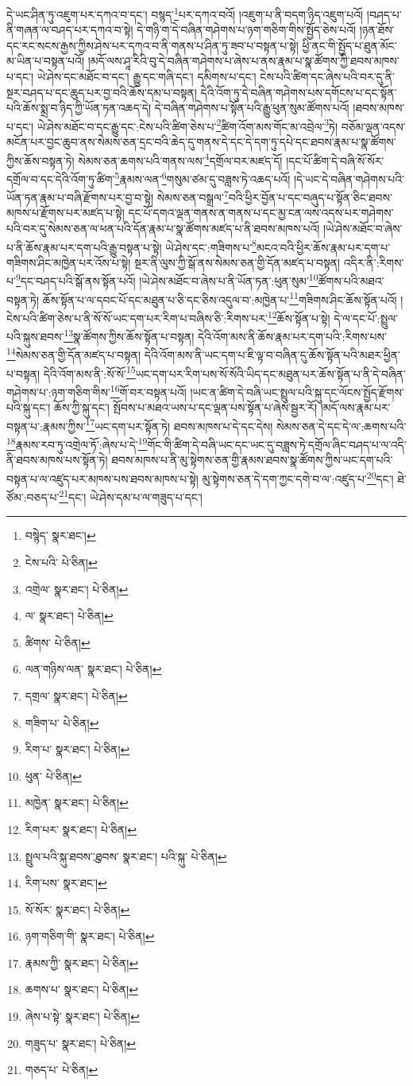 དེ་ཡང་ཤིན་ཏུ་འཇུག་པར་དཀའ་བ་དང་། བསྙད་\footnote{བསྙེད་  སྣར་ཐང་། }པར་དཀའ་བའོ། །འཇུག་པ་ནི་བདག་ཉིད་འཇུག་པའོ། །བཤད་པ་ནི་གཞན་ལ་བཤད་པར་དཀའ་བ་སྟེ། དེ་གཉི་ག་དེ་བཞིན་གཤེགས་པ་ཉག་གཅིག་གིས་སྤྱོད་ཅེས་པའོ། །ཉན་ཐོས་དང་རང་སངས་རྒྱས་ཀྱིས་ཤེས་པར་དཀའ་བ་ནི་གནས་པ་ཤིན་ཏུ་ཟབ་པ་བསྟན་པ་སྟེ། ཕྱི་ནང་གི་སྤྱོད་པ་ཐུན་མོང་མ་ཡིན་པ་བསྟན་པའོ། །མདོ་ལས་ཤཱ་རིའི་བུ་དེ་བཞིན་གཤེགས་པ་ཞེས་པ་ནས་རྣམ་པ་སྣ་ཚོགས་ཀྱི་ཐབས་མཁས་པ་དང་། ཡེ་ཤེས་དང་མཐོང་བ་དང་། རྒྱུ་དང་གཞི་དང་། དམིགས་པ་དང་། ངེས་པའི་ཚིག་དང་ཞེས་པའི་བར་དུ་ནི་སྔར་བཤད་པ་དང་ཆུད་པར་བྱ་བའི་ཆོས་དམ་པ་བསྟན། དེའི་འོག་ཏུ་དེ་བཞིན་གཤེགས་པས་དགོངས་པ་དང་སྟོན་པའི་ཆོས་སྨྲ་བ་ཉིད་ཀྱི་ཡོན་ཏན་འཆད་དེ། དེ་བཞིན་གཤེགས་པ་སྟོན་པའི་རྒྱུ་ཕུན་སུམ་ཚོགས་པའོ། །ཐབས་མཁས་པ་དང་། ཡེ་ཤེས་མཐོང་བ་དང་རྒྱུ་དང་:ངེས་པའི་ཚིག་ཅེས་པ་\footnote{ངེས་པའི་  པེ་ཅིན། }ཚིག་འོག་མས་གོང་མ་འབྲེལ་\footnote{འགྲེལ་  སྣར་ཐང་།  པེ་ཅིན། }ཏེ། བཅོམ་ལྡན་འདས་མངོན་པར་བྱང་ཆུབ་ནས་སེམས་ཅན་དྲང་བའི་ཆེད་དུ་གནས་དེ་དང་དེ་དག་ཏུ་དཔེ་དང་ཐབས་རྣམ་པ་སྣ་ཚོགས་ཀྱིས་ཆོས་བསྟན་ཏེ། སེམས་ཅན་ཆགས་པའི་གནས་ལས་\footnote{ལ་  སྣར་ཐང་།  པེ་ཅིན། }དགྲོལ་བར་མཛད་དོ། །དང་པོ་ཚིག་དེ་བཞི་སོ་སོར་དགྲོལ་བ་དང་དེའི་འོག་ཏུ་ཚིག་\footnote{ཚིགས་  པེ་ཅིན། }རྣམས་ལན་\footnote{ལན་གཉིས་ལན་  སྣར་ཐང་།  པེ་ཅིན། }གསུམ་ཙམ་དུ་བཟླས་ཏེ་འཆད་པའོ། །དེ་ཡང་དེ་བཞིན་གཤེགས་པའི་ཡོན་ཏན་རྣམ་པ་བཞི་རྫོགས་པར་བྱ་བ་སྟེ། སེམས་ཅན་བསྒྲལ་\footnote{དགྲལ་  སྣར་ཐང་།  པེ་ཅིན། }བའི་ཕྱིར་བྱོན་པ་དང་བཞུད་པ་སྟོན་ཅིང་ཐབས་མཁས་པ་རྫོགས་པར་མཛད་པ་སྟེ། དང་པོ་དགའ་ལྡན་གནས་ན་གནས་པ་དང་མྱ་ངན་ལས་འདས་པར་གཤེགས་པའི་བར་དུ་སེམས་ཅན་ལ་ཕན་པའི་དོན་རྣམ་པ་སྣ་ཚོགས་མཛད་པ་ནི་ཐབས་མཁས་པའོ། །ཡེ་ཤེས་མཐོང་བ་ཞེས་པ་ནི་ཆོས་རྣམ་པར་དག་པའི་རྒྱུ་བསྟན་པ་སྟེ། ཡེ་ཤེས་དང་:གཟིགས་པ་\footnote{གཟིག་པ་  པེ་ཅིན། }མངའ་བའི་ཕྱིར་ཆོས་རྣམ་པར་དག་པ་གཟིགས་ཤིང་མཁྱེན་པར་འོས་པ་སྟེ། སྔར་ནི་ལུས་ཀྱི་སྒོ་ནས་སེམས་ཅན་གྱི་དོན་མཛད་པ་བསྟན། འདིར་ནི་:རིགས་པ་\footnote{རིག་པ་  སྣར་ཐང་།  པེ་ཅིན། }དང་བཤད་པའི་སྒོ་ནས་སྟོན་པའོ། །ཡེ་ཤེས་མཐོང་བ་ཞེས་པ་ནི་ཡོན་ཏན་:ཕུན་སུམ་\footnote{ཕུན་  པེ་ཅིན། }ཚོགས་པའི་མཐའ་བསྟན་ཏེ། ཆོས་སྟོན་པ་ལ་དབང་པོ་དང་མཐུན་པ་ཅི་དང་ཅིས་འདུལ་བ་:མཁྱེན་པ་\footnote{མཁྱེན་  སྣར་ཐང་།  པེ་ཅིན། }གཟིགས་ཤིང་ཆོས་སྟོན་པའོ། །ངེས་པའི་ཚིག་ཅེས་པ་ནི་སོ་སོ་ཡང་དག་པར་རིག་པ་བཞིས་ཅི་:རིགས་པར་\footnote{རིག་པར་  སྣར་ཐང་།  པེ་ཅིན། }ཆོས་སྟོན་པ་སྟེ། དེ་ལ་དང་པོ་:སྤྲུལ་པའི་སྐུས་ཐབས་\footnote{སྤྲུལ་པའི་སྐུ་ཐབས་ུ་ཐབས་  སྣར་ཐང་། པའི་སྐུ་  པེ་ཅིན། }སྣ་ཚོགས་ཀྱིས་ཆོས་སྟོན་པ་བསྟན། དེའི་འོག་མས་ནི་ཆོས་རྣམ་པར་དག་པའི་:རིགས་པས་\footnote{རིག་པས་  སྣར་ཐང་། }སེམས་ཅན་གྱི་དོན་མཛད་པ་བསྟན། དེའི་འོག་མས་ནི་ཡང་དག་པ་ཇི་ལྟ་བ་བཞིན་དུ་ཆོས་སྟོན་པའི་མཐར་ཕྱིན་པ་བསྟན། དེའི་འོག་མས་ནི་:སོ་སོ་\footnote{སོ་སོར་  སྣར་ཐང་།  པེ་ཅིན། }ཡང་དག་པར་རིག་པས་སོ་སོའི་ཡིད་དང་མཐུན་པར་ཆོས་སྟོན་པ་ནི་དེ་བཞིན་གཤེགས་པ་:ཉག་གཅིག་གིས་\footnote{ཉག་གཅིག་གི་  སྣར་ཐང་།  པེ་ཅིན། }གོ་བར་བསྟན་པའོ། །ཡང་ན་ཚིག་དེ་བཞི་ཡང་སྤྲུལ་པའི་སྐུ་དང་ལོངས་སྤྱོད་རྫོགས་པའི་སྐུ་དང་། ཆོས་ཀྱི་སྐུ་དང་། སྤོབས་པ་མཐའ་ཡས་པ་དང་ལྡན་པས་སྟོན་པ་ཞེས་སྦྱར་རོ། །མདོ་ལས་རྣམ་པར་བསྟན་པ་:རྣམས་ཀྱིས་\footnote{རྣམས་ཀྱི་  སྣར་ཐང་།  པེ་ཅིན། }ཡང་དག་པར་སྟོན་ཏེ། ཐབས་མཁས་པ་དེ་དང་དེས། སེམས་ཅན་དེ་དང་དེ་ལ་:ཆགས་པའི་\footnote{ཆགས་པ་  སྣར་ཐང་།  པེ་ཅིན། }རྣམས་རབ་ཏུ་འགྲེལ་ཏོ་:ཞེས་པ་དེ་\footnote{ཞེས་པ་སྟེ་  སྣར་ཐང་།  པེ་ཅིན། }གོང་གི་ཚིག་དེ་བཞི་ཡང་དང་ཡང་དུ་བཟླས་ཏེ་དགྲོལ་ཞིང་བཤད་པ་ལ་འདི་ནི་ཐབས་མཁས་པས་སྟོན་ཏེ། ཐབས་མཁས་པ་ནི་མུ་སྟེགས་ཅན་གྱི་རྣམས་ཐབས་སྣ་ཚོགས་ཀྱིས་ཡང་དག་པའི་བསྟན་པ་ལ་འཛུད་པར་མཁས་པས་ཐབས་མཁས་པ་སྟེ། མུ་སྟེགས་ཅན་དེ་དག་ཀྱང་དགེ་བ་ལ་:འཛུད་པ་\footnote{གཟུད་པ་  སྣར་ཐང་།  པེ་ཅིན། }དང་། ཐེ་ཙོམ་:བཅད་པ་\footnote{གཅད་པ་  པེ་ཅིན། }དང་། ཡེ་ཤེས་དམ་པ་ལ་གཟུད་པ་དང་། 